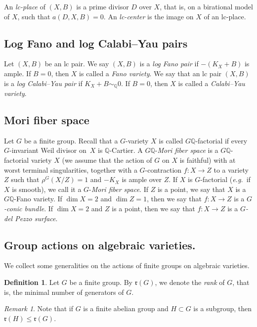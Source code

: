\documentclass[10pt,a4paper]{article}
\theoremstyle{definition}
\newtheorem{defin}[thm]{Definition}
\theoremstyle{remark}
\newtheorem{remark}[thm]{Remark}
\begin{document}
An \emph{lc-place} of $(X, B)$ is a prime divisor $D$ over $X$, that
is, on a birational model of $X$, such that $a(D, X, B) = 0$. An
\emph{lc-center} is the image on $X$ of an lc-place.

\subsection{Log Fano and log Calabi--Yau pairs}
\label{sect-log-CY}
Let $(X, B)$ be an lc pair. We say $(X,B)$ is a \emph{log Fano pair} if $-(K_X+B)$ is ample.  If $B=0$, then $X$ is called a \emph{Fano variety}.  We say that an lc pair $(X,B)$ is a \emph{log Calabi--Yau pair} if $K_X + B \sim_{\mathbb{Q}} 0$. If $B=0$, then $X$ is called a \emph{Calabi--Yau variety}.

\subsection{Mori fiber space}
\label{subsec-mfs}
Let $G$ be a finite group.  Recall that a $G$-variety $X$ is called $G\mathbb{Q}$-factorial if every $G$-invariant Weil divisor on~$X$ is $\mathbb{Q}$-Cartier.  A $G\mathbb{Q}$-\emph{Mori fiber space} is a $G\mathbb{Q}$-factorial variety $X$ (we assume that the action of $G$ on $X$ is faithful) with at worst terminal singularities, together with a $G$-contraction $f\colon X\to Z$ to a variety $Z$ such that $\rho^G(X/Z)=1$ and $-K_X$ is ample over $Z$. If $X$ is $G$-factorial (\textit{e.g.}~if $X$ is smooth), we call it a $G$-\emph{Mori fiber space}.  If $Z$ is a point, we say that $X$ is a $G\mathbb{Q}$-Fano variety.  If $\dim X=2$ and $\dim Z=1$, then we say that $f\colon X\to Z$ is a \emph{$G$-conic bundle}.  If $\dim X=2$ and $Z$ is a point, then we say that $f\colon X\to Z$ is a \emph{$G$-del Pezzo surface}.

\setcounter{subsection}{6}\setcounter{thm}{3}

\subsection{Group actions on algebraic varieties.}
We collect some generalities on the actions of finite groups on algebraic varieties. 

\begin{defin}
Let $G$ be a finite group. By $\mathfrak{r}(G)$, we denote the \emph{rank} of $G$, that is, the minimal number of generators of $G$.
\end{defin}

\begin{remark}
\label{rem-rank-subgroup}
Note that if $G$ is a finite abelian group and $H\subset G$ is a subgroup, then $\mathfrak{r}(H)\leq \mathfrak{r}(G)$. 
\end{remark}
\end{document}
